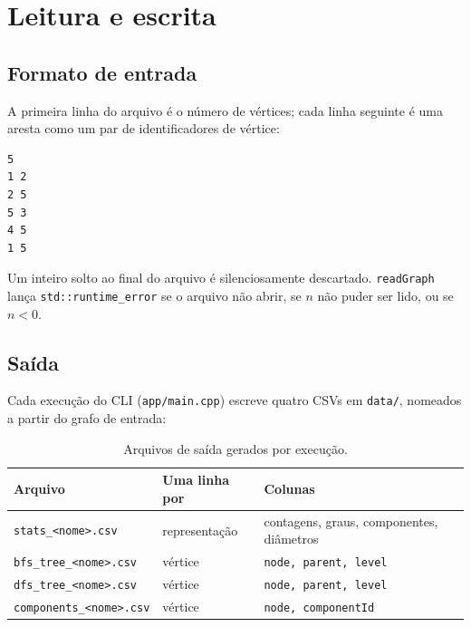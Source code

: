 \documentclass[a4paper,11pt]{article}
\begin{document}
\section{Leitura e escrita}

\subsection{Formato de entrada}

A primeira linha do arquivo é o número de vértices; cada linha seguinte é
uma aresta como um par de identificadores de vértice:

\begin{lstlisting}[language=bash,numbers=none]
5
1 2
2 5
5 3
4 5
1 5
\end{lstlisting}

Um inteiro solto ao final do arquivo é silenciosamente descartado.
\texttt{readGraph} lança \texttt{std::runtime\_error} se o arquivo não
abrir, se $n$ não puder ser lido, ou se $n < 0$.

\subsection{Saída}

Cada execução do CLI (\texttt{app/main.cpp}) escreve quatro CSVs em
\texttt{data/}, nomeados a partir do grafo de entrada:

\begin{table}[h]
\centering
\caption{Arquivos de saída gerados por execução.}
\begin{tabular}{@{}lll@{}}
\toprule
\textbf{Arquivo} & \textbf{Uma linha por} & \textbf{Colunas} \\
\midrule
\texttt{stats\_<nome>.csv} & representação & contagens, graus, componentes, diâmetros \\
\texttt{bfs\_tree\_<nome>.csv} & vértice & \texttt{node, parent, level} \\
\texttt{dfs\_tree\_<nome>.csv} & vértice & \texttt{node, parent, level} \\
\texttt{components\_<nome>.csv} & vértice & \texttt{node, componentId} \\
\bottomrule
\end{tabular}
\end{table}

\end{document}
